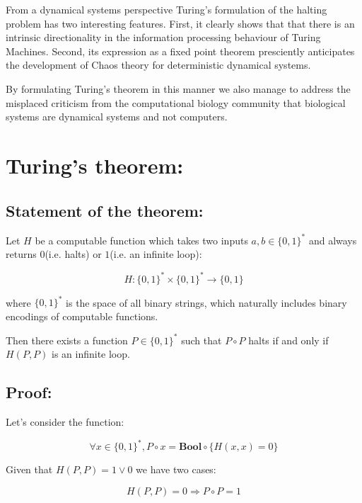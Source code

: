 \documentclass{article}
\begin{document}
From a dynamical systems perspective Turing's formulation of the halting problem has two interesting features.
First, it clearly shows that that there is an intrinsic directionality in the information processing behaviour of Turing Machines. Second, its expression as a fixed point theorem presciently anticipates the development of Chaos theory for deterministic dynamical systems.

By formulating Turing's theorem in this manner we also manage to address the misplaced criticism from the computational biology community that biological systems are dynamical systems and not computers.

\newpage


\section{Turing's theorem:}

\subsection{Statement of the theorem:}

Let $H$ be a computable function which takes two inputs $a,b \in \{0,1\}^*$ and always
returns $0$(i.e. halts) or $1$(i.e. an infinite loop):

\begin{equation}
H: \{0,1\}^* \times \{0,1\}^* \rightarrow \{0,1\}
\end{equation}

where $\{0,1\}^*$ is the space of all binary strings, which naturally includes binary encodings
of computable functions.

Then there exists a function $P \in \{0,1\}^*$ such that $P \circ P$ halts if and only if
$H(P,P)$ is an infinite loop.

\subsection{Proof:}

Let's consider the function:

\begin{equation}
\forall x \in \{0,1\}^*, P \circ x = \textbf{Bool} \circ \{H(x,x) = 0\}
\end{equation}

Given that $H(P,P) = 1 \lor 0$ we have two cases:

\begin{equation}
H(P,P) = 0 \Rightarrow P \circ P = 1
\end{equation}
\end{document}
